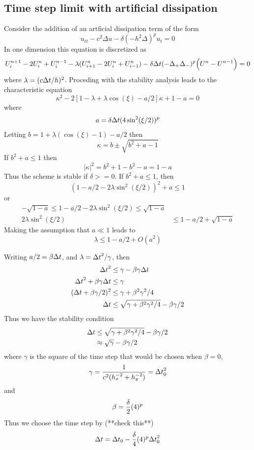 \documentclass[10pt]{article}
\begin{document}
\subsection{Time step limit with artificial dissipation}


Consider the addition of an artficial dissipation term of the form
\[
  u_{tt} - c^2 \Delta u - \delta (-h^2\Delta)^p u_t =0
\]
In one dimension this equation is discretized as
\[
    U_i^{n+1} -2U_i^n + U_i^{n-1} - \lambda( U_{i+1}^n -2U_i^n + U_{i-1}^n )
                    - \delta {\Delta t} (-\Delta_+\Delta_-)^p\Big( U^n - U^{n-1}\Big) =0
\]
where $\lambda=(c{\Delta t}/h)^2$.
Proceding with the stability analysis leads to 
the characteristic equation 
\[
   \kappa^2 - 2[ 1-\lambda +\lambda\cos(\xi) - a/2 ]\kappa + 1-a = 0 
\]
where
\[
    a = \delta {\Delta t} ( 4\sin^2(\xi/2) )^p 
\]
Letting $b=1+\lambda(\cos(\xi)-1) -a/2$ then
\[
   \kappa = b \pm \sqrt{b^2+a -1}
\]
If $b^2 + a \le 1 $ then
\[
  |\kappa|^2 = b^2 + 1 - b^2 -a  =1-a 
\]
Thus the scheme is stable if $\delta>=0$. If $b^2 + a \le 1 $, then
\[
    ( 1-a/2 - 2\lambda\sin^2(\xi/2) )^2 + a \le 1 
\]
or
\begin{align*}
 -\sqrt{1-a} \le  1-a/2  - 2\lambda\sin^2(\xi/2) \le \sqrt{1-a}  \\
  2\lambda\sin^2(\xi/2) &\le 1-a/2 + \sqrt{1-a} 
\end{align*}
Making the assumption that $a\ll 1 $ leads to
\[
   \lambda \le 1-a/2 +O(a^2)
\]

Writing $a/2 = \beta{\Delta t}$, and $\lambda= {\Delta t}^2 /\gamma$, then
\begin{align*}
{\Delta t}^2 &\le \gamma - \beta\gamma{\Delta t} \\
 {\Delta t}^2 + \beta\gamma{\Delta t} &\le \gamma  \\
 ({\Delta t} + \beta\gamma/2)^2 &\le \gamma + \beta^2\gamma^2/4 \\
 {\Delta t} &\le \sqrt{\gamma + \beta^2\gamma^2/4} - \beta\gamma/2 
\end{align*}
Thus we have the stability condition
\begin{align*}
{\Delta t} &\le \sqrt{\gamma + \beta^2\gamma^2/4} - \beta\gamma/2 \\
    &\approx \sqrt{\gamma} - \beta\gamma/2 
\end{align*}
where $\gamma$ is the square of the time step that would be chosen when $\beta=0$,
\[
   \gamma = {1\over c^2 ( h_x^{-2} + h_y^{-2} )} = {\Delta t}_0^2
\]
and
\[
   \beta = {\delta\over 2} ( 4 )^p 
\]
Thus we choose the time step by (**check this**)
\[
   {\Delta t} = {\Delta t}_0 - {\delta\over 4} ( 4 )^p {\Delta t}_0^2 
\]
\end{document}
